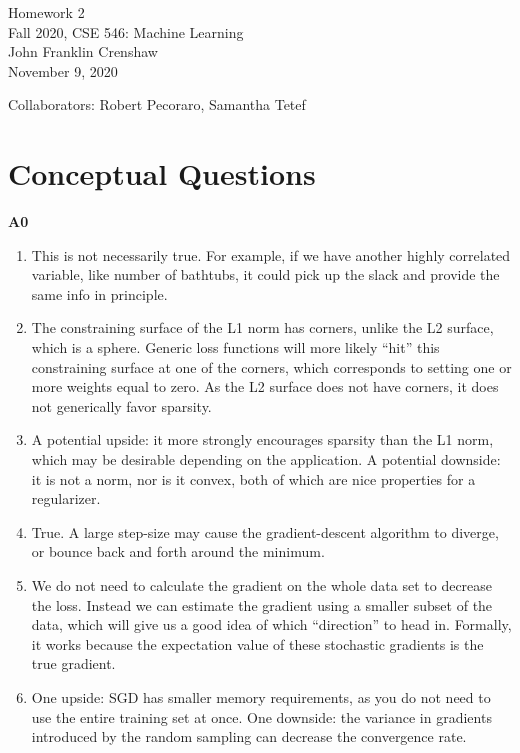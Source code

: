 \documentclass{article}
\renewcommand{\title}{Homework 2}
\renewcommand{\date}{November 9, 2020}
\begin{document}
\begin{center}
        \LARGE \title \\ \vspace{10pt}
        \normalsize 
        Fall 2020, CSE 546: Machine Learning \\ \vspace{2pt}
        John Franklin Crenshaw \\ \vspace{2pt}
        \date
\end{center}

Collaborators: Robert Pecoraro, Samantha Tetef

\section*{Conceptual Questions}

\textbf{A0}
\begin{enumerate}
        \item This is not necessarily true.
        For example, if we have another highly correlated variable, like number of bathtubs, it could pick up the slack and provide the same info in principle.
        \item The constraining surface of the L1 norm has corners, unlike the L2 surface, which is a sphere.
        Generic loss functions will more likely ``hit'' this constraining surface at one of the corners, which corresponds to setting one or more weights equal to zero.
        As the L2 surface does not have corners, it does not generically favor sparsity.
        \item A potential upside: it more strongly encourages sparsity than the L1 norm, which may be desirable depending on the application.
        A potential downside: it is not a norm, nor is it convex, both of which are nice properties for a regularizer.
        \item True. A large step-size may cause the gradient-descent algorithm to diverge, or bounce back and forth around the minimum. 
        \item We do not need to calculate the gradient on the whole data set to decrease the loss.
        Instead we can estimate the gradient using a smaller subset of the data, which will give us a good idea of which ``direction'' to head in.
        Formally, it works because the expectation value of these stochastic gradients is the true gradient.
        \item One upside: SGD has smaller memory requirements, as you do not need to use the entire training set at once.
        One downside: the variance in gradients introduced by the random sampling can decrease the convergence rate.
\end{enumerate}
\end{document}
